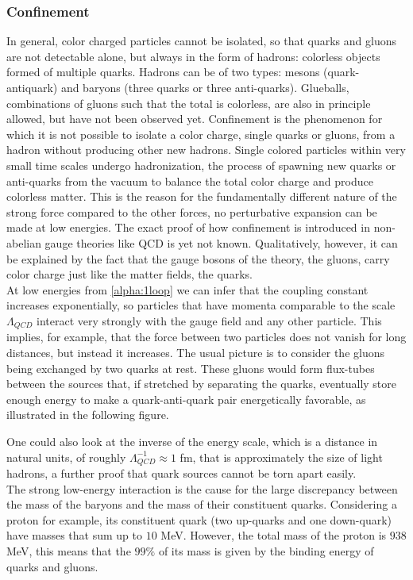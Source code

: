 \subsubsection{Confinement}
In general, color charged particles cannot be isolated, so that quarks and gluons are not detectable alone, but always in the form of hadrons: colorless objects formed of multiple quarks. Hadrons can be of two types: mesons (quark-antiquark) and baryons (three quarks or three anti-quarks). Glueballs, combinations of gluons such that the total is colorless, are also in principle allowed, but have not been observed yet. Confinement is the phenomenon for which it is not possible to isolate a color charge, single quarks or gluons, from a hadron without producing other new hadrons. Single colored particles within very small time scales undergo hadronization, the process of spawning new quarks or anti-quarks from the vacuum to balance the total color charge and produce colorless matter. This is the reason for the fundamentally different nature of the strong force compared to the other forces, no perturbative expansion can be made at low energies. The exact proof of how confinement is introduced in non-abelian gauge theories like QCD is yet not known. Qualitatively, however, it can be explained by the fact that the gauge bosons of the theory, the gluons, carry color charge just like the matter fields, the quarks. \\
At low energies from \cref{alpha:1loop} we can infer that the coupling constant increases exponentially, so particles that have momenta comparable to the scale $\Lambda_{QCD}$ interact very strongly with the gauge field and any other particle. This implies, for example, that the force between two particles does not vanish for long distances, but instead it increases. The usual picture is to consider the gluons being exchanged by two quarks at rest. These gluons would form flux-tubes between the sources that, if stretched by separating the quarks, eventually store enough energy to make a quark-anti-quark pair energetically favorable, as illustrated in the following figure. 
 

One could also look at the inverse of the energy scale, which is a distance in natural units, of roughly $\Lambda_{QCD}^{-1} \approx 1 $ fm, that is approximately the size of light hadrons, a further proof that quark sources cannot be torn apart easily.\\
The strong low-energy interaction is the cause for the large discrepancy between the mass of the baryons and the mass of their constituent quarks. Considering a proton for example, its constituent quark (two up-quarks and one down-quark) have masses that sum up to $10$ MeV. However, the total mass of the proton is $938$ MeV, this means that the $99\%$ of its mass is given by the binding energy of quarks and gluons.

